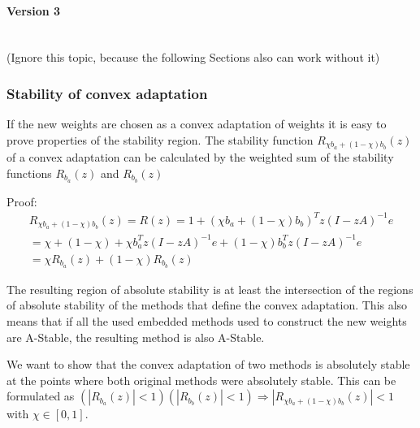 \documentclass[a4paper]{article}
\numberwithin{equation}{section}
\theoremstyle{plain}
\theoremstyle{definition}
\numberwithin{theorem}{section}
\newcommand{\1}{\mathbbm{1}}
\begin{document}
\paragraph*{Version 3} $ $\\
(Ignore this topic, because the following Sections also can work without it)



\subsubsection{Stability of convex adaptation}
If the new weights are chosen as a convex adaptation of weights it is easy to prove properties of the stability region.
The stability function $R_{\chi b_a + (1-\chi) b_b}(z)$ of a convex adaptation can be calculated by the weighted sum of the stability functions $R_{b_a}(z)$ and $R_{b_b}(z)$

Proof:
\begin{multline}
R_{\chi b_a + (1-\chi) b_b}(z) = R(z) = 1 + (\chi b_a + (1-\chi) b_b)^Tz(I - zA)^{-1}e \\
= \chi + (1-\chi) + \chi b_a ^Tz(I - zA)^{-1}e + (1-\chi) b_b^Tz(I - zA)^{-1}e \\
= \chi R_{b_a}(z) + (1-\chi) R_{b_b}(z)
\end{multline}

The resulting region of absolute stability is at least the intersection of the regions of absolute stability of the methods that define the convex adaptation. This also means that if all the used embedded methods used to construct the new weights are A-Stable, the resulting method is also A-Stable.

We want to show that the convex adaptation of two methods is absolutely stable at the points where both original methods were absolutely stable.
This can be formulated as $(|R_{b_a}(z)|  < 1) (|R_{b_b}(z)| < 1) \Rightarrow |R_{\chi b_a +(1- \chi) b_b}(z)| < 1$ with $\chi \in [0,1]$.
\end{document}
